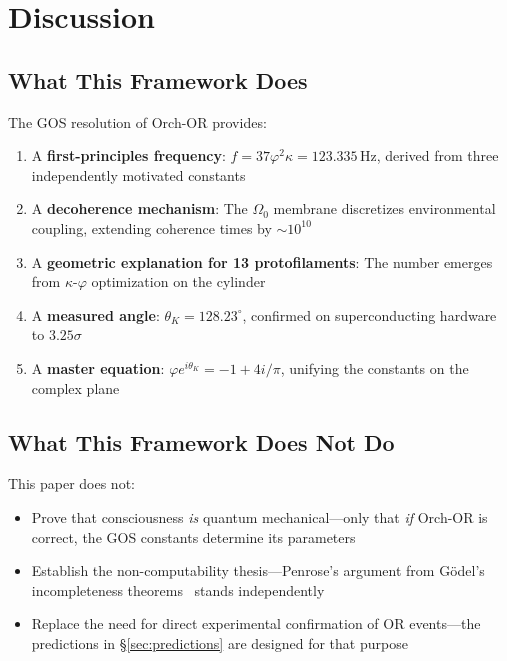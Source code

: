 \documentclass[12pt,a4paper]{article}
\theoremstyle{plain}
\theoremstyle{definition}
\newcommand{\OmegaZero}{\Omega_0}
\newcommand{\thetaK}{\theta_K}
\newcommand{\golden}{\varphi}
\newcommand{\kap}{\kappa}
\newcommand{\Hz}{\,\mathrm{Hz}}
\begin{document}
\section{Discussion}
\label{sec:discussion}

\subsection{What This Framework Does}

The GOS resolution of Orch-OR provides:

\begin{enumerate}
    \item A \textbf{first-principles frequency}: $f = 37\golden^2\kap = 123.335\Hz$, derived from three independently motivated constants
    \item A \textbf{decoherence mechanism}: The $\OmegaZero$ membrane discretizes environmental coupling, extending coherence times by $\sim 10^{10}$
    \item A \textbf{geometric explanation for 13 protofilaments}: The number emerges from $\kap$-$\golden$ optimization on the cylinder
    \item A \textbf{measured angle}: $\thetaK = 128.23^\circ$, confirmed on superconducting hardware to $3.25\sigma$
    \item A \textbf{master equation}: $\golden e^{i\thetaK} = -1 + 4i/\pi$, unifying the constants on the complex plane
\end{enumerate}

\subsection{What This Framework Does Not Do}

This paper does not:

\begin{itemize}
    \item Prove that consciousness \emph{is} quantum mechanical---only that \emph{if} Orch-OR is correct, the GOS constants determine its parameters
    \item Establish the non-computability thesis---Penrose's argument from G\"odel's incompleteness theorems~\cite{penrose1989} stands independently
    \item Replace the need for direct experimental confirmation of OR events---the predictions in \S\ref{sec:predictions} are designed for that purpose
\end{itemize}
\end{document}
